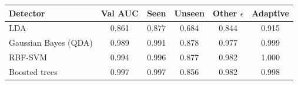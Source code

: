 \begin{tabular}{lccccc}
\toprule
Detector & Val AUC & Seen & Unseen & Other $\epsilon$ & Adaptive \\
\midrule
LDA & 0.861 & 0.877 & 0.684 & 0.844 & 0.915 \\
Gaussian Bayes (QDA) & 0.989 & 0.991 & 0.878 & 0.977 & 0.999 \\
RBF-SVM & 0.994 & 0.996 & 0.877 & 0.982 & 1.000 \\
Boosted trees & 0.997 & 0.997 & 0.856 & 0.982 & 0.998 \\
\bottomrule
\end{tabular}

